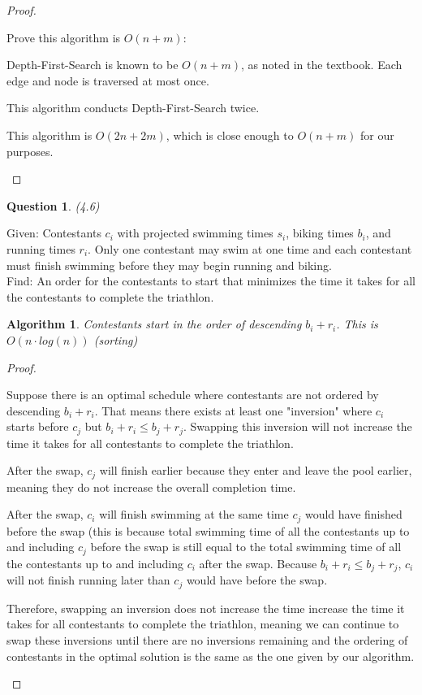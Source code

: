 \documentclass[11pt, oneside]{article}   	%
\newtheorem{Question}{Question}
\newtheorem{Algorithm}{Algorithm}
\begin{document}
\begin{proof}
\begin{description}
Prove this algorithm is $O(n+m)$:

 Depth-First-Search is known to be $O(n+m)$, as noted in the textbook. Each edge and node is traversed at most once.

This algorithm conducts Depth-First-Search twice.

This algorithm is $O(2n+2m)$, which is close enough to $O(n+m)$ for our purposes.

\end{description}
\end{proof}

\newpage

\begin{Question} (4.6)
\end{Question}
\noindent Given: Contestants $c_i$ with projected swimming times $s_i$, biking times $b_i$, and running times $r_i$. Only one contestant may swim at one time and each contestant must finish swimming before they may begin running and biking.\\

\noindent Find: An order for the contestants to start that minimizes the time it takes for all the contestants to complete the triathlon. 

\begin{Algorithm}
Contestants start in the order of descending $b_i + r_i$. This is $O(n \cdot log(n))$ (sorting)
\end{Algorithm}

\begin{proof}
\begin{description}
Suppose there is an optimal schedule where contestants are not ordered by descending $b_i + r_i$. That means there exists at least one "inversion" where $c_i$ starts before $c_j$ but $b_i+r_i \leq b_j+r_j$. Swapping this inversion will not increase the time it takes for all contestants to complete the triathlon.

After the swap, $c_j$ will finish earlier because they enter and leave the pool earlier, meaning they do not increase the overall completion time.

After the swap, $c_i$ will finish swimming at the same time $c_j$ would have finished before the swap (this is because total swimming time of all the contestants up to and including $c_j$ before the swap is still equal to the total swimming time of all the contestants up to and including $c_i$ after the swap. Because $b_i+r_i \leq b_j+r_j$, $c_i$ will not finish running later than $c_j$ would have before the swap.

Therefore, swapping an inversion does not increase the time increase the time it takes for all contestants to complete the triathlon, meaning we can continue to swap these inversions until there are no inversions remaining and the ordering of contestants in the optimal solution is the same as the one given by our algorithm. 
\end{description}
\end{proof}
\end{document}
